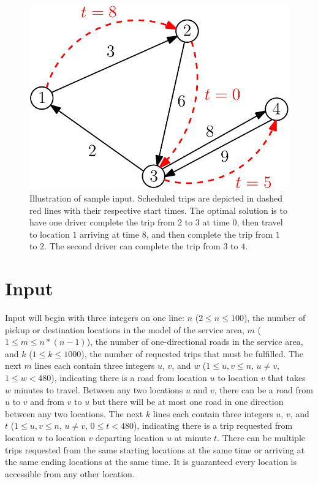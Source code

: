 \documentclass[11pt,letterpaper]{article}
\begin{document}
\begin{figure}[h]
	\begin{center}
		\includegraphics[scale=0.3]{sample-graph.png}
	\end{center}
	\caption{Illustration of sample input. Scheduled trips are depicted in dashed red lines with their respective start times. The optimal solution is to have one driver complete the trip from $2$ to $3$ at time $0$, then travel to location $1$ arriving at time $8$, and then complete the trip from $1$ to $2$. The second driver can complete the trip from $3$ to $4$.}
	\label{fig:sample}
\end{figure}

\section*{Input}
Input will begin with three integers on one line: $n$ ($2 \leq n \leq 100$), the number of pickup or destination locations in the model of the service area, $m$ ($1 \leq m \leq n*(n-1)$), the number of one-directional roads in the service area, and $k$ ($1 \leq k \leq 1000$), the number of requested trips that must be fulfilled. The next $m$ lines each contain three integers $u$, $v$, and $w$ ($1 \leq u,v \leq n$, $u \neq v$, $1 \leq w < 480$), indicating there is a road from location $u$ to location $v$ that takes $w$ minutes to travel. Between any two locations $u$ and $v$, there can be a road from $u$ to $v$ and from $v$ to $u$ but there will be at most one road in one direction between any two locations. The next $k$ lines each contain three integers $u$, $v$, and $t$ ($1 \leq u,v \leq n$, $u \neq v$, $0 \leq t < 480$), indicating there is a trip requested from location $u$ to location $v$ departing location $u$ at minute $t$. There can be multiple trips requested from the same starting locations at the same time or arriving at the same ending locations at the same time. It is guaranteed every location is accessible from any other location.
\end{document}
